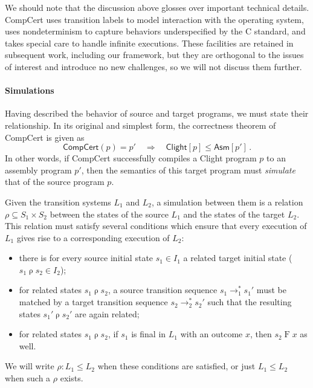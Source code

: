 \documentclass[acmsmall,screen,review,anonymous]{acmart}
\newcommand{\kw}[1]{\ensuremath{ \mathsf{#1} }}
\begin{document}
We should note that the discussion above glosses over important technical details.
CompCert uses transition labels to model interaction with the operating system,
uses nondeterminism to capture behaviors underspecified by the C standard,
and takes special care to handle infinite executions.
These facilities are retained in subsequent work,
including our framework,
but they are orthogonal to the issues of interest
and introduce no new challenges,
so we will not discuss them further.

\paragraph{Simulations}

Having described the behavior of source and target programs,
we must state their relationship.
In its original and simplest form,
the correctness theorem of CompCert is given as
\begin{equation}
    \kw{CompCert}(p) = p'
    \quad\Longrightarrow\quad
    \kw{Clight}[p] \le \kw{Asm}[p']
    \,.
    \label{eqn:ccc-wp}
\end{equation}
In other words,
if CompCert successfully compiles a Clight program $p$
to an assembly program $p'$,
then the semantics of this target program must
\emph{simulate} that of the source program $p$.

Given the transition systems $L_1$ and $L_2$,
a simulation between them is a relation $\rho \subseteq S_1 \times S_2$
between the states of the source $L_1$
and the states of the target $L_2$.
This relation must satisfy several conditions
which ensure that
every execution of $L_1$ gives rise
to a corresponding execution of $L_2$:
\begin{itemize}
  \item there is for every source initial state $s_1 \in I_1$
    a related target initial state ($s_1 \mathrel\rho s_2 \in I_2$);
  \item for related states $s_1 \mathrel\rho s_2$,
    a source transition sequence $s_1 \rightarrow_1^* s_1'$ must be matched by
    a target transition sequence $s_2 \rightarrow_2^* s_2'$ such that
    the resulting states $s_1' \mathrel\rho s_2'$ are again related;
  \item for related states $s_1 \mathrel\rho s_2$,
    if $s_1$ is final in $L_1$ with an outcome $x$,
    then $s_2 \mathrel{F} x$ as well.
\end{itemize}
We will write $\rho : L_1 \le L_2$ when these conditions are satisfied,
or just $L_1 \le L_2$ when such a $\rho$ exists.
\end{document}
